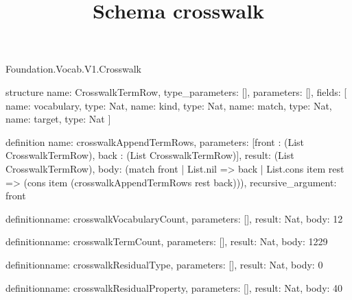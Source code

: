 \begin{lexlean}{Foundation.Vocab.V1.Crosswalk}
\title{Schema crosswalk}
\begin{semanticmodule}
structure{
  name: CrosswalkTermRow,
  type_parameters: [],
  parameters: [],
  fields: [
    {name: vocabulary, type: Nat},
    {name: kind, type: Nat},
    {name: match, type: Nat},
    {name: target, type: Nat}
  ]
}

definition{
  name: crosswalkAppendTermRows,
  parameters: [front : (List CrosswalkTermRow), back : (List CrosswalkTermRow)],
  result: (List CrosswalkTermRow),
  body: (match front
    | List.nil => back
    | List.cons item rest => (cons item (crosswalkAppendTermRows rest back))),
  recursive_argument: front
}

definition{name: crosswalkVocabularyCount, parameters: [], result: Nat, body: 12}

definition{name: crosswalkTermCount, parameters: [], result: Nat, body: 1229}

definition{name: crosswalkResidualType, parameters: [], result: Nat, body: 0}

definition{name: crosswalkResidualProperty, parameters: [], result: Nat, body: 40}


\end{semanticmodule}
\end{lexlean}
